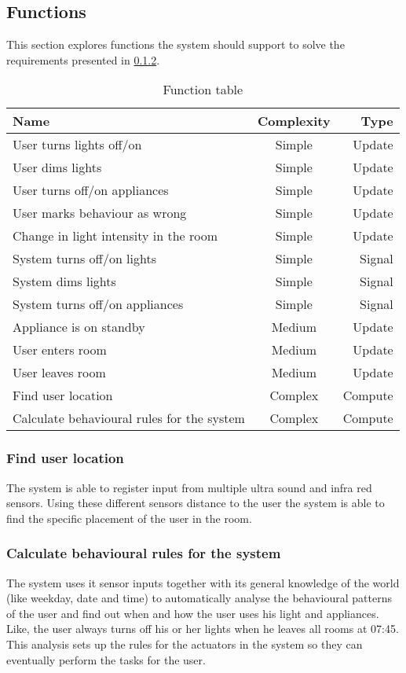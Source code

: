 \subsection{Functions}

This section explores functions the system should support to solve the requirements presented in \cref{}.


\label{subsec:Functions}
\begin{table}[hbtp]
\centering
\begin{tabular}{lcr}
\toprule
\textbf{Name}																& \textbf{Complexity}	& \textbf{Type} \\
\midrule
User turns lights off/on				& Simple	& Update  \\
User dims lights					& Simple	& Update  \\
User turns off/on appliances			& Simple	& Update  \\
User marks behaviour as wrong			& Simple	& Update  \\
Change in light intensity in the room		& Simple	& Update  \\
System turns off/on lights			& Simple	& Signal  \\
System dims lights				& Simple	& Signal  \\
System turns off/on appliances			& Simple	& Signal  \\
Appliance is on standby				& Medium	& Update  \\
User enters room				& Medium	& Update  \\
User leaves room				& Medium	& Update  \\
Find user location			& Complex	& Compute \\
Calculate behavioural rules for the system	& Complex	& Compute \\
\bottomrule
\end{tabular}
\caption{Function table}
\label{table:functionlist}
\end{table}

\subsubsection{Find user location}
The system is able to register input from multiple ultra sound and infra red sensors. Using these different sensors distance to the user the system is able to find the specific placement of the user in the room.

\subsubsection{Calculate behavioural rules for the system}
The system uses it sensor inputs together with its general knowledge of the world (like weekday, date and time) to automatically analyse the behavioural patterns of the user and find out when and how the user uses his light and appliances. Like, the user always turns off his or her lights when he leaves all rooms at 07:45. This analysis sets up the rules for the actuators in the system so they can eventually perform the tasks for the user.

